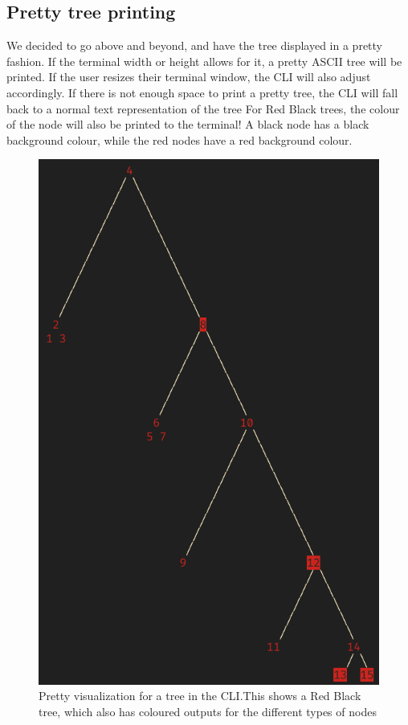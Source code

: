 \documentclass[letterpaper]{article}
\begin{document}
\subsection{Pretty tree printing}
We decided to go above and beyond, and have the tree displayed in a pretty
fashion. If the terminal width or height allows for it, a pretty ASCII tree will
be printed. If the user resizes their terminal window, the CLI will also adjust
accordingly.  If there is not enough space to print a pretty tree, the CLI will
fall back to a normal text representation of the tree For Red Black trees, the
colour of the node will also be printed to the terminal! A black node has a
black background colour, while the red nodes have a red background colour.
\begin{figure}[H]
      \centering
      \includegraphics[width=.8\textwidth]{rbtree.png}
      \caption{Pretty visualization for a tree in the CLI.\@ This shows a Red
      Black tree, which also has coloured outputs for the different types of
      nodes}
\end{figure}
\end{document}
